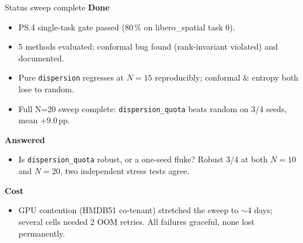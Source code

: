 \documentclass[aspectratio=169]{beamer}
\newcommand{\good}[1]{\textcolor{good}{#1}}
\begin{document}
\begin{frame}{Status \textemdash{} sweep complete}
\textbf{Done}
\begin{itemize}
  \item PS.4 single-task gate passed (80\,\% on libero\_spatial task 0).
  \item 5 methods evaluated; conformal bug found (rank-invariant violated) and documented.
  \item Pure \texttt{dispersion} regresses at $N{=}15$ \good{reproducibly}; conformal \& entropy both lose to random.
  \item \good{Full N=20 sweep complete}: \texttt{dispersion\_quota} beats random on \good{3/4} seeds, mean \good{$+9.0$\,pp}.
\end{itemize}

\textbf{Answered}
\begin{itemize}
  \item Is \texttt{dispersion\_quota} robust, or a one-seed fluke? \good{Robust} \textemdash{} 3/4 at both $N{=}10$ and $N{=}20$, two independent stress tests agree.
\end{itemize}

\textbf{Cost}
\begin{itemize}
  \item GPU contention (HMDB51 co-tenant) stretched the sweep to $\sim$4 days; several cells needed 2 OOM retries. All failures graceful, none lost permanently.
\end{itemize}
\end{frame}
\end{document}
